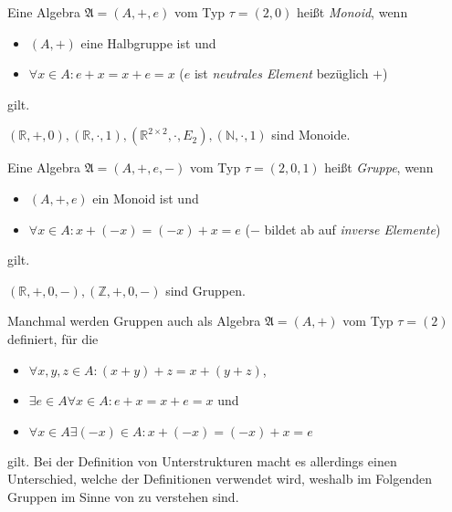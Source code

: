 \begin{definition}\label{def:monoid}
    Eine Algebra $\mathfrak{A} = (A, +, e)$ vom Typ $\tau = (2,0)$ heißt \emph{Monoid}, wenn
    \begin{itemize}[topsep=0pt, label={--}]
        \item $(A, +)$ eine Halbgruppe ist und
        \item $\forall x \in A: e + x = x + e = x$ \tab ($e$ ist \emph{neutrales Element} bezüglich $+$)
    \end{itemize}
    gilt.
\end{definition}

\begin{example}
    $(\mathbb{R}, +, 0), (\mathbb{R}, \cdot, 1), (\mathbb{R}^{2\times 2}, \cdot, E_2), (\mathbb{N}, \cdot, 1)$ sind Monoide.
\end{example}

\begin{definition}\label{def:gruppe}
    Eine Algebra $\mathfrak{A} = (A, +, e, -)$ vom Typ $\tau = (2,0,1)$ heißt \emph{Gruppe}, wenn
    \begin{itemize}[topsep=0pt, label={--}]
        \item $(A, +, e)$ ein Monoid ist und
        \item $\forall x \in A: x + (-x) = (-x) + x = e$ \tab ($-$ bildet ab auf \emph{inverse Elemente})
    \end{itemize}
    gilt.
\end{definition}

\begin{example}
    $(\mathbb{R},+, 0, -), (\mathbb{Z}, +, 0, -)$ sind Gruppen.
\end{example}

\begin{remark}\label{rem:alternativegruppe}
    Manchmal werden Gruppen auch als Algebra $\mathfrak{A} = (A, +)$ vom Typ $\tau = (2)$ definiert, für die
    \begin{itemize}[topsep=0pt, label={--}]
        \item $\forall x,y,z \in A: (x + y) + z = x + (y + z)$,
        \item $\exists e \in A \forall x \in A: e + x = x + e = x$ und 
        \item $\forall x \in A \exists (-x) \in A: x + (-x) = (-x) + x = e$
    \end{itemize}
    gilt.
    Bei der Definition von Unterstrukturen macht es allerdings einen Unterschied, welche der Definitionen verwendet wird, weshalb im Folgenden Gruppen im Sinne von  zu verstehen sind.
\end{remark}

